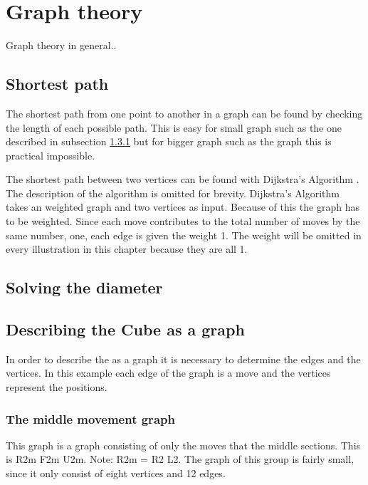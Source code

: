 \chapter {Graph theory}

Graph theory  in general..


\section{Shortest path}
The shortest path from one point to another in a graph can be found by checking the length of each possible path. This is easy for small graph such as the one described in subsection \ref{sub:middleMoveGroup} but for bigger graph such as the \rubik{} graph this is practical impossible. 

The shortest path between two vertices can be found with Dijkstra's Algorithm \cite[p. 651]{Rosen07}. The description of the algorithm is omitted for brevity. Dijkstra's Algorithm takes an weighted graph and two vertices as input. Because of this the \rubik{} graph has to be weighted. Since each move contributes to the total number of moves by the same number, one, each edge is given the weight 1. The weight will be omitted in every illustration in this chapter because they are all 1.  

\section{Solving the diameter}



\section{Describing the Cube as a graph}
In order to describe the \rubik{} as a graph it is necessary to determine the edges and the vertices. In this example each edge of the graph is a move and the vertices represent the positions.  



\subsection{The middle movement graph}
\label{sub:middleMoveGroup}
This graph is a \rubik{} graph consisting of only the moves that \twist{} the middle sections. This is R2m F2m U2m. Note: R2m = R2 L2.  The graph of this group is fairly small, since it only consist of eight vertices and 12 edges. 